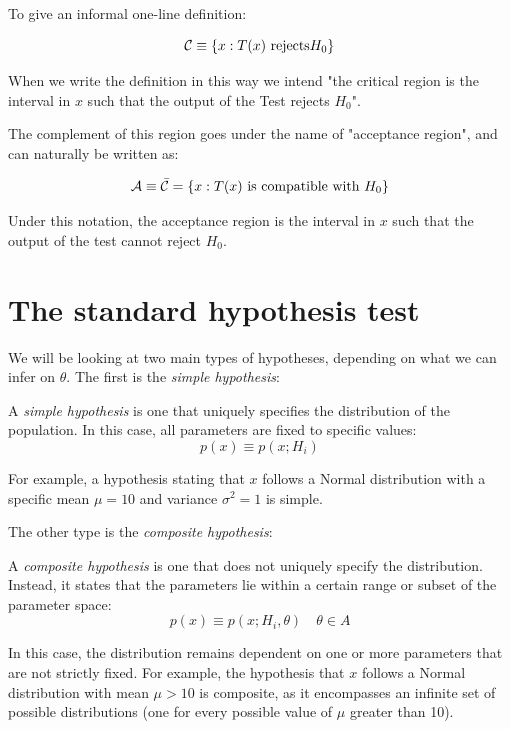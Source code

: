 To give an informal one-line definition:

	\[
	\mathcal{C} \equiv \{x: T(x)\text{ rejects} H_0\}
	\]

When we write the definition in this way we intend "the critical region is the interval in $x$ such that the output of the Test rejects $H_0$".

The complement of this region goes under the name of "acceptance region", and can naturally be written as:

	\[
	\mathcal{A}\equiv\bar{\mathcal{C}} = \{x: T(x) \text{ is compatible with } H_0\}
	\]

Under this notation, the acceptance region is the interval in $x$ such that the output of the test cannot reject $H_0$.

\section{The standard hypothesis test}
We will be looking at two main types of hypotheses, depending on what we can infer on $\theta$. The first is the \emph{simple hypothesis}:

\begin{definition}
	A \emph{simple hypothesis} is one that uniquely specifies the distribution of the population. In this case, all parameters are fixed to specific values:
	\[
	p(x) \equiv p(x; H_i)
	\]
\end{definition}

For example, a hypothesis stating that $x$ follows a Normal distribution with a specific mean $\mu=10$ and variance $\sigma^2=1$ is simple.

The other type is the \emph{composite hypothesis}:
\begin{definition}
	A \emph{composite hypothesis} is one that does not uniquely specify the distribution. Instead, it states that the parameters lie within a certain range or subset of the parameter space:
	\[
	p(x) \equiv p(x; H_i, \theta) \quad \theta \in A
	\]
\end{definition}

In this case, the distribution remains dependent on one or more parameters that are not strictly fixed. For example, the hypothesis that $x$ follows a Normal distribution with mean $\mu > 10$ is composite, as it encompasses an infinite set of possible distributions (one for every possible value of $\mu$ greater than 10). 

